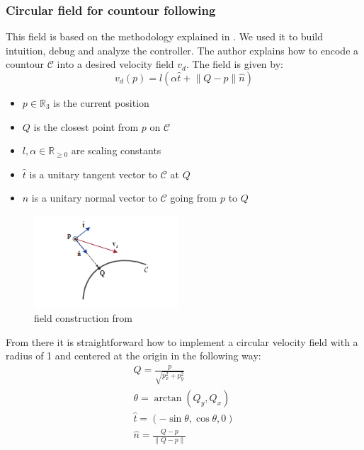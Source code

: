 \subsubsection{Circular field for countour following}
This field is based on the methodology explained in \cite{asl2019assistive}. We used it to build intuition, debug and analyze the controller.
The author explains how to encode a countour $\mathcal{C}$ into a desired velocity field $v_d$.
The field is given by: 
\begin{equation}
    v_d(p) = l(\alpha \hat{t} + \lVert Q-p \rVert \hat{n}) 
\end{equation}
\begin{itemize}
    \item $p\in \mathbb{R}_3$ is the current position
    \item $Q$ is the closest point from $p$ on $\mathcal{C}$
    \item $l , \alpha \in \mathbb{R}_{\geq 0}$ are scaling constants
    \item $\hat{t}$ is a unitary tangent vector to $\mathcal{C}$ at $Q$
    \item $\hat{n}$ is a unitary normal vector to $\mathcal{C}$ going from $p$ to $Q$
\end{itemize}

\begin{figure}[h!]
    \centering
    \includegraphics[width=0.48\textwidth]{Images/fieldconstruction.png}
    \caption{field construction from \cite{asl2019assistive}}
    \label{fig:fieldconstruction}
\end{figure} 

From there it is straightforward how to implement a circular velocity field with a radius of 1 and centered at the origin in the following way:
\begin{align}
    Q = \frac{p}{\sqrt{p_x^2 + p_y^2}}\\
    \theta = \arctan(Q_y, Q_x) \\
    \hat{t} = (-\sin{\theta}, \cos{\theta}, 0) \\
    \hat{n} = \frac{Q-p}{\lVert Q-p \rVert}
\end{align}
